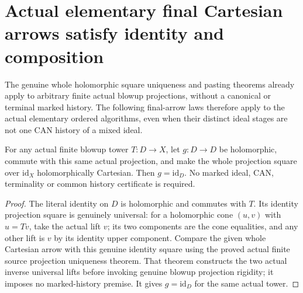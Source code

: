 \section{Actual elementary final Cartesian arrows satisfy identity and composition}
\label{sec:hironaka-actual-elementary-cartesian-naturality}

The genuine whole holomorphic square uniqueness and pasting theorems
already apply to arbitrary finite actual blowup projections, without a
canonical or terminal marked history. The following final-arrow laws
therefore apply to the actual elementary ordered algorithms, even when
their distinct ideal stages are not one CAN history of a mixed ideal.

\begin{theorem}
\label{hir:actual-elementary-cartesian-identity}
For any actual finite blowup tower $T:D\to X$, let $g:D\to D$ be
holomorphic, commute with this same actual projection, and make the
whole projection square over $\mathrm{id}_X$ holomorphically Cartesian.
Then $g=\mathrm{id}_D$. No marked ideal, CAN, terminality or common
history certificate is required.
\leanok
\end{theorem}
\begin{proof}
The literal identity on $D$ is holomorphic and commutes with $T$.
Its identity projection square is genuinely universal: for a
holomorphic cone $(u,v)$ with $u=T v$, take the actual lift $v$;
its two components are the cone equalities, and any other lift is
$v$ by its identity upper component. Compare the given whole Cartesian
arrow with this genuine identity square using the proved actual finite
source projection uniqueness theorem. That theorem constructs the two
actual inverse universal lifts before invoking genuine blowup
projection rigidity; it imposes no marked-history premise. It gives
$g=\mathrm{id}_D$ for the same actual tower.
\end{proof}

